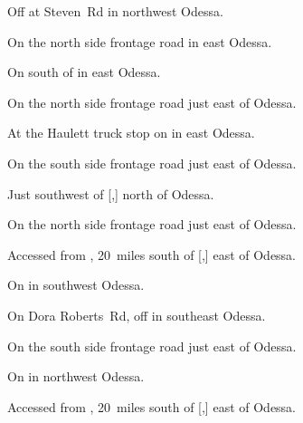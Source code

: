 

\begin{LocationList}

Off  at Steven~Rd in northwest Odessa.

On the north side  frontage road in east Odessa.

On  south of  in east Odessa.

\Location{\GarageHQ \Garage}
On the north side  frontage road just east of Odessa.

At the Haulett truck stop on  in east Odessa.

On the south side  frontage road just east of Odessa.

Just southwest of [,] north of Odessa.

On the north side  frontage road just east of Odessa.

Accessed from , 20~miles south of [,] east of Odessa.

On  in southwest Odessa.

On  Dora Roberts~Rd, off  in southeast Odessa.

On the south side  frontage road just east of Odessa.

On  in northwest Odessa.

Accessed from , 20~miles south of [,] east of Odessa.

\end{LocationList}
